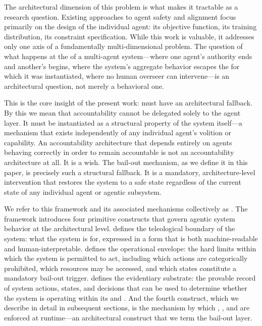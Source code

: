 The architectural dimension of this problem is what makes it tractable as a research question. Existing approaches to agent safety and alignment focus primarily on the design of the individual agent: its objective function, its training distribution, its constraint specification. While this work is valuable, it addresses only one axis of a fundamentally multi-dimensional problem. The question of what happens at the \bounds of a multi-agent system—where one agent's authority ends and another's begins, where the system's aggregate behavior escapes the \purpose for which it was instantiated, where no human overseer can intervene—is an architectural question, not merely a behavioral one.

This is the core insight of the present work: \accountability must have an architectural fallback. By this we mean that accountability cannot be delegated solely to the agent layer. It must be instantiated as a structural property of the system itself—a mechanism that exists independently of any individual agent's volition or capability. An accountability architecture that depends entirely on agents behaving correctly in order to remain accountable is not an accountability architecture at all. It is a wish. The bail-out mechanism, as we define it in this paper, is precisely such a structural fallback. It is a mandatory, architecture-level intervention that restores the system to a safe state regardless of the current state of any individual agent or agentic subsystem.

We refer to this framework and its associated mechanisms collectively as \bxthree. The \bxthree framework introduces four primitive constructs that govern agentic system behavior at the architectural level. \textbf{\purpose} defines the teleological boundary of the system: what the system is for, expressed in a form that is both machine-readable and human-interpretable. \textbf{\bounds} defines the operational envelope: the hard limits within which the system is permitted to act, including which actions are categorically prohibited, which resources may be accessed, and which states constitute a mandatory bail-out trigger. \textbf{\fact} defines the evidentiary substrate: the provable record of system actions, states, and decisions that can be used to determine whether the system is operating within its \purpose and \bounds. And the fourth construct, which we describe in detail in subsequent sections, is the mechanism by which \purpose, \bounds, and \fact are enforced at runtime—an architectural construct that we term the \bxthree bail-out layer.


